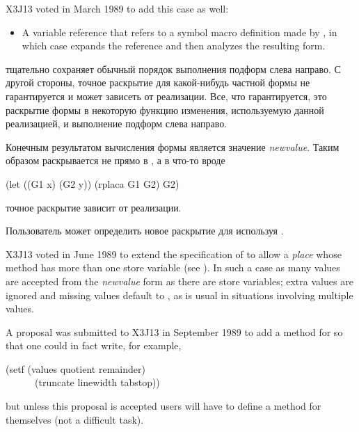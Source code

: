 \begin{defmac}
\begin{new}
X3J13 voted in March 1989
 to add this case as well:
\begin{itemize}
\item A variable reference that refers to a symbol macro definition made by
, in which case  expands the reference and
then analyzes the resulting form.
\end{itemize}
\end{new}

 тщательно сохраняет обычный порядок выполнения подформ слева
направо.
С другой стороны, точное раскрытие для какой-нибудь частной формы не
гарантируется и может зависеть от реализации. Все, что гарантируется, это 
раскрытие  формы в некоторую функцию изменения, используемую данной
реализацией, и выполнение подформ слева направо.

Конечным результатом вычисления формы  является значение
\emph{newvalue}. Таким образом  раскрывается не прямо в
, а в что-то вроде
\begin{lisp}
(let ((G1 x) (G2 y)) (rplaca G1 G2) G2)
\end{lisp}
точное раскрытие зависит от реализации.

Пользователь может определить новое раскрытие для  используя
.

\begin{newer}
X3J13 voted in June 1989 
to extend the specification of  to allow a \emph{place}
whose  method has more than one store variable (see ).
In such a case as many values are accepted from the \emph{newvalue} form
as there are store variables; extra values are ignored
and missing values default to ,
as is usual in situations involving multiple values.

A proposal was submitted to X3J13 in September 1989
to add a  method for  so that one could
in fact write, for example,
\begin{lisp}
(setf (values quotient remainder) \\
~~~~~~(truncate linewidth tabstop))
\end{lisp}
but unless this proposal is accepted users will have to
define a  method for  themselves (not a difficult task).
\end{newer}
\end{defmac}

